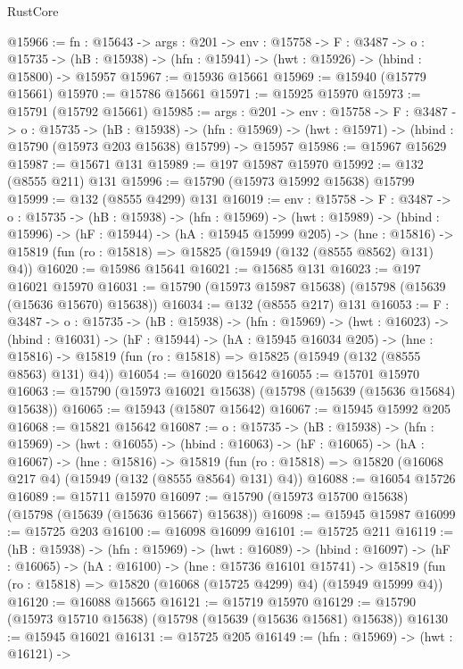 \begin{lexlean}{RustCore}
\begin{coremodule}
@15966 := {fn : @15643} ->
  {args : @201} ->
  {env : @15758} ->
  {F : @3487} ->
  {o : @15735} -> (hB : @15938) -> (hfn : @15941) -> (hwt : @15926) -> (hbind : @15800) -> @15957
@15967 := @15936 @15661
@15969 := @15940 (@15779 @15661)
@15970 := @15786 @15661
@15971 := @15925 @15970
@15973 := @15791 (@15792 @15661)
@15985 := {args : @201} ->
  {env : @15758} ->
  {F : @3487} ->
  {o : @15735} ->
  (hB : @15938) ->
  (hfn : @15969) -> (hwt : @15971) -> (hbind : @15790 (@15973 @203 @15638) @15799) -> @15957
@15986 := @15967 @15629
@15987 := @15671 @131
@15989 := @197 @15987 @15970
@15992 := @132 (@8555 @211) @131
@15996 := @15790 (@15973 @15992 @15638) @15799
@15999 := @132 (@8555 @4299) @131
@16019 := {env : @15758} ->
  {F : @3487} ->
  {o : @15735} ->
  (hB : @15938) ->
  (hfn : @15969) ->
  (hwt : @15989) ->
  (hbind : @15996) ->
  (hF : @15944) ->
  (hA : @15945 @15999 @205) ->
  (hne : @15816) -> @15819 (fun (ro : @15818) => @15825 (@15949 (@132 (@8555 @8562) @131) @4))
@16020 := @15986 @15641
@16021 := @15685 @131
@16023 := @197 @16021 @15970
@16031 := @15790 (@15973 @15987 @15638) (@15798 (@15639 (@15636 @15670) @15638))
@16034 := @132 (@8555 @217) @131
@16053 := {F : @3487} ->
  {o : @15735} ->
  (hB : @15938) ->
  (hfn : @15969) ->
  (hwt : @16023) ->
  (hbind : @16031) ->
  (hF : @15944) ->
  (hA : @15945 @16034 @205) ->
  (hne : @15816) -> @15819 (fun (ro : @15818) => @15825 (@15949 (@132 (@8555 @8563) @131) @4))
@16054 := @16020 @15642
@16055 := @15701 @15970
@16063 := @15790 (@15973 @16021 @15638) (@15798 (@15639 (@15636 @15684) @15638))
@16065 := @15943 (@15807 @15642)
@16067 := @15945 @15992 @205
@16068 := @15821 @15642
@16087 := {o : @15735} ->
  (hB : @15938) ->
  (hfn : @15969) ->
  (hwt : @16055) ->
  (hbind : @16063) ->
  (hF : @16065) ->
  (hA : @16067) ->
  (hne : @15816) ->
  @15819 (fun (ro : @15818) => @15820 (@16068 @217 @4) (@15949 (@132 (@8555 @8564) @131) @4))
@16088 := @16054 @15726
@16089 := @15711 @15970
@16097 := @15790 (@15973 @15700 @15638) (@15798 (@15639 (@15636 @15667) @15638))
@16098 := @15945 @15987
@16099 := @15725 @203
@16100 := @16098 @16099
@16101 := @15725 @211
@16119 := (hB : @15938) ->
  (hfn : @15969) ->
  (hwt : @16089) ->
  (hbind : @16097) ->
  (hF : @16065) ->
  (hA : @16100) ->
  (hne : @15736 @16101 @15741) ->
  @15819 (fun (ro : @15818) => @15820 (@16068 (@15725 @4299) @4) (@15949 @15999 @4))
@16120 := @16088 @15665
@16121 := @15719 @15970
@16129 := @15790 (@15973 @15710 @15638) (@15798 (@15639 (@15636 @15681) @15638))
@16130 := @15945 @16021
@16131 := @15725 @205
@16149 := (hfn : @15969) ->
  (hwt : @16121) ->

\end{coremodule}
\end{lexlean}
